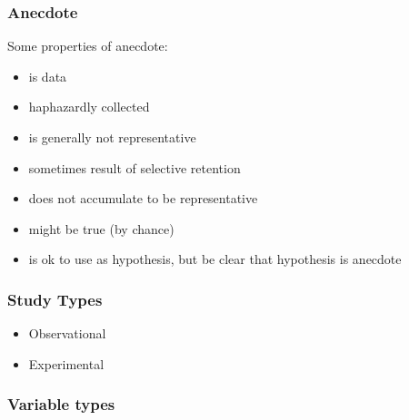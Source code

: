 \begin{frame}
{    
  }

\end{frame}

\begin{frame}
  \frametitle{Anecdote}

  Some properties of anecdote:
  
  \begin{itemize}
  \item is data
  \item haphazardly collected
  \item is generally not representative
  \item sometimes result of selective retention
  \item does not accumulate to be representative
  \item might be true (by chance)
  \item is ok to use as hypothesis, but be clear that hypothesis is anecdote
  \end{itemize}
\end{frame}

\begin{frame}
  \frametitle{Study Types}

  \begin{itemize}
  \item Observational
  \item Experimental
  \end{itemize}
  
\end{frame}

\begin{frame}
  \frametitle{Variable types}
\end{frame}

\begin{frame}
\end{frame}

